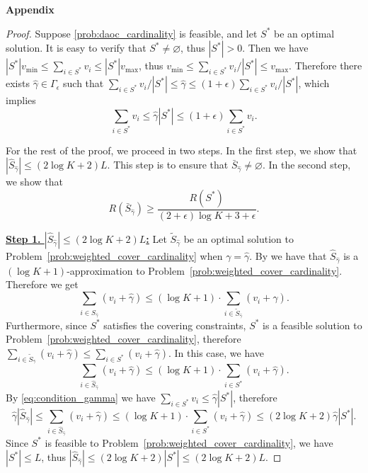 \documentclass[msom,non-blindrev]{informs3} %
\theoremstyle{definition}
\begin{document}
\begin{appendices}{\Large \noindent\textbf{Appendix}}
{\begin{proof}
Suppose \eqref{prob:daoc_cardinality} is feasible, and let $S^*$ be an optimal solution. It is easy to verify that $S^*\neq \varnothing$, thus $|S^*|>0$. Then we have \mbox{$|S^*|v_{\min}\leq \sum_{i\in S^*}v_i\leq |S^*|v_{\max}$,} thus \mbox{$v_{\min}\leq \sum_{i\in S^*}v_i/|S^*|\leq v_{\max}$.} Therefore there exists $\hat{\gamma}\in\Gamma_\epsilon$ such that $\sum_{i\in S^*}v_i/|S^*|\leq \hat{\gamma}\leq (1+\epsilon)\sum_{i\in S^*}v_i/|S^*|$, which implies 
\begin{equation}\label{eq:condition_gamma}
\sum_{i\in S^*}v_i\leq \hat{\gamma}|S^*|\leq (1+\epsilon)\sum_{i\in S^*}v_i.
\end{equation}

For the rest of the proof, we proceed in two steps. In the first step, we show that \mbox{$|\hat{S}_{\hat{\gamma}}|\leq (2\log K+2)L$.} This step is to ensure that $\bar{S}_{\hat{\gamma}}\neq\varnothing$. In the second step, we show that
\begin{equation*}
R(\bar{S}_{\hat{\gamma}})\geq \dfrac{R(S^*)}{(2+\epsilon)\log K+3+\epsilon}.
\end{equation*}

\noindent\underline{\bf Step 1. $|\hat{S}_{\hat{\gamma}}|\leq (2\log K+2)L$:} Let $\tilde{S}_{\hat{\gamma}}$ be an optimal solution to Problem~\eqref{prob:weighted_cover_cardinality} when $\gamma=\hat{\gamma}$. By \cite{lovasz1975ratio} we have that $\hat{S}_{\hat{\gamma}}$ is a $(\log K+1)$-approximation to Problem~\eqref{prob:weighted_cover_cardinality}. Therefore we get
\begin{equation*}
\sum_{i\in \hat{S}_{\hat{\gamma}}} (v_i+\hat{\gamma})\leq (\log K+1)\cdot \sum_{i\in \tilde{S}_{\hat{\gamma}}} (v_i+\hat{\gamma}).
\end{equation*}
Furthermore, since $S^*$ satisfies the covering constraints, $S^*$ is a feasible solution to Problem~\eqref{prob:weighted_cover_cardinality}, therefore $\sum_{i\in \tilde{S}_{\hat{\gamma}}} (v_i+\hat{\gamma})\leq \sum_{i\in S^*} (v_i+\hat{\gamma})$. In this case, we have
\begin{equation*}
\sum_{i\in \hat{S}_{\hat{\gamma}}} (v_i+\hat{\gamma})\leq (\log K+1)\cdot \sum_{i\in S^*}(v_i+\hat{\gamma}).
\end{equation*}
By \eqref{eq:condition_gamma} we have $\sum_{i\in S^*}v_i\leq \hat{\gamma}|S^*|$, therefore
\begin{equation*}
\hat{\gamma}|\hat{S}_{\hat{\gamma}}|\leq \sum_{i\in \hat{S}_{\hat{\gamma}}} (v_i+\hat{\gamma})\leq (\log K+1)\cdot \sum_{i\in S^*} (v_i+\hat{\gamma})\leq (2\log K+2)\hat{\gamma}|S^*|.
\end{equation*}
Since $S^*$ is feasible to Problem~\eqref{prob:weighted_cover_cardinality}, we have $|S^*|\leq L$, thus $|\hat{S}_{\hat{\gamma}}|\leq (2\log K+2)|S^*|\leq (2\log K+2)L$. 


\end{proof}}
\end{appendices}
\end{document}
